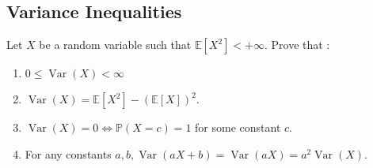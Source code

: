 \begin{center}
  \section*{Variance Inequalities}
\end{center}

\begin{Exercise}
  Let $X$ be a random variable such that $\mathbb{E}\left[X^2\right]<+\infty$. Prove that :
  \begin{enumerate}
    \item $0 \leq \operatorname{Var}(X)<\infty$
    \item $\operatorname{Var}(X)=\mathbb{E}\left[X^2\right]-{(\mathbb{E}[X])}^2$.
    \item $\operatorname{Var}(X)=0 \Longleftrightarrow \mathbb{P}(X=c)=1$ for some constant $c$.
    \item For any constants $a, b, \operatorname{Var}(a X+b)=\operatorname{Var}(a X)=a^2 \operatorname{Var}(X)$.
  \end{enumerate}
\end{Exercise}

